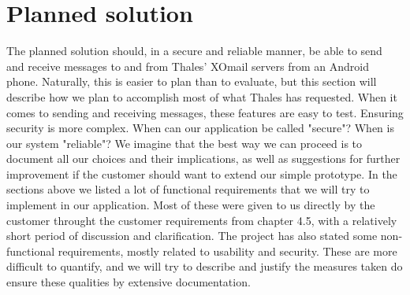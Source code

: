 \section{Planned solution}

The planned solution should, in a secure and reliable manner, be able to send and receive messages to and from Thales' XOmail servers from an Android phone. Naturally, this is easier to plan than to evaluate, but this section will describe how we plan to accomplish most of what Thales has requested.
\newline
\newline
When it comes to sending and receiving messages, these features are easy to test. Ensuring security is more complex. When can our application be called "secure"? When is our system "reliable"? We imagine that the best way we can proceed is to document all our choices and their implications, as well as suggestions for further improvement if the customer should want to extend our simple prototype.
\newline
\newline
In the sections above we listed a lot of functional requirements that we will try to implement in our application. Most of these were given to us directly by the customer throught the customer requirements from chapter 4.5, with a relatively short period of discussion and clarification.
\newline
\newline
The project has also stated some non-functional requirements, mostly related to usability and security. These are more difficult to quantify, and we will try to describe and justify the measures taken do ensure these qualities by extensive documentation.